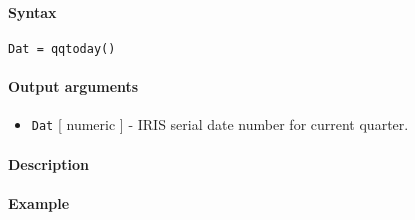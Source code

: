 


	\paragraph{Syntax}\label{syntax}

\begin{verbatim}
Dat = qqtoday()
\end{verbatim}

\paragraph{Output arguments}\label{output-arguments}

\begin{itemize}
\itemsep1pt\parskip0pt
\item
  \texttt{Dat} {[} numeric {]} - IRIS serial date number for current
  quarter.
\end{itemize}

\paragraph{Description}\label{description}

\paragraph{Example}\label{example}


